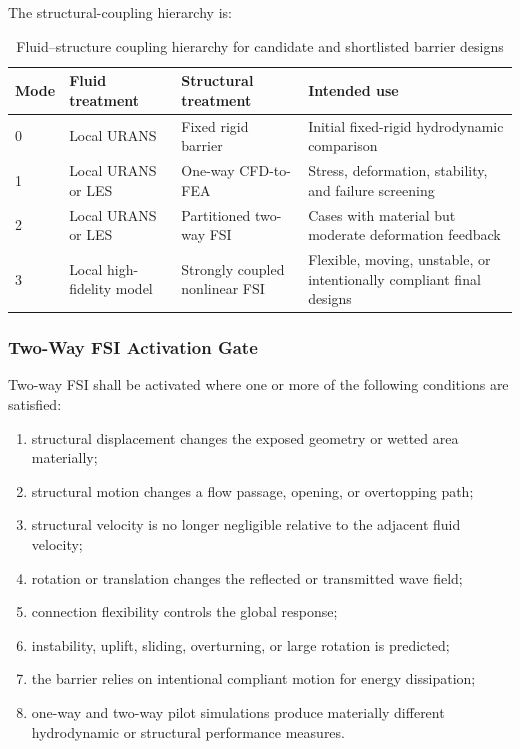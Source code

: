 The structural-coupling hierarchy is:

\begin{table}[htbp]
  \centering
  \small
  \renewcommand{\arraystretch}{1.25}
  \begin{tabular}{
      p{}
      p{}
      p{}
      p{}
    }
    \hline
    Mode
    &
    Fluid treatment
    &
    Structural treatment
    &
    Intended use
    \\
    \hline
    0
    &
    Local URANS
    &
    Fixed rigid barrier
    &
    Initial fixed-rigid hydrodynamic comparison
    \\
    1
    &
    Local URANS or LES
    &
    One-way CFD-to-FEA
    &
    Stress, deformation, stability, and failure screening
    \\
    2
    &
    Local URANS or LES
    &
    Partitioned two-way FSI
    &
    Cases with material but moderate deformation feedback
    \\
    3
    &
    Local high-fidelity model
    &
    Strongly coupled nonlinear FSI
    &
    Flexible, moving, unstable, or intentionally compliant final
    designs
    \\
    \hline
  \end{tabular}
  \caption{Fluid--structure coupling hierarchy for candidate and
  shortlisted barrier designs}
  \label{tab:res-str-fsi-fidelity-hierarchy}
\end{table}

\subsubsection{Two-Way FSI Activation Gate}
\label{sec:res-str-fsi-activation-gate}

Two-way FSI shall be activated where one or more of the following
conditions are satisfied:

\begin{enumerate}
  \item structural displacement changes the exposed geometry or
    wetted area materially;
  \item structural motion changes a flow passage, opening, or
    overtopping path;
  \item structural velocity is no longer negligible relative to the
    adjacent fluid velocity;
  \item rotation or translation changes the reflected or transmitted
    wave field;
  \item connection flexibility controls the global response;
  \item instability, uplift, sliding, overturning, or large rotation
    is predicted;
  \item the barrier relies on intentional compliant motion for energy
    dissipation;
  \item one-way and two-way pilot simulations produce materially
    different hydrodynamic or structural performance measures.
\end{enumerate}

